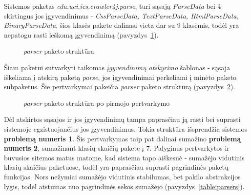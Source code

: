 Sistemos paketas \textit{edu.uci.ics.crawler4j.parse}, turi sąsają \textit{ParseData} bei 4 skirtingus jos įgyvendinimus - \textit{CssParseData, TextParseData, HtmlParseData, BinaryParseData},
šios klasės pakete dalinasi vieta dar su 9 klasėmis, todėl yra nepatogu rasti ieškomą įgyvendinimą (pavyzdys~\ref{fig:parse}).
\begin{figure}[H]
    \snugshade
    \endsnugshade
    \caption{\textit{parser} paketo struktūra}
    \label{fig:parse}
\end{figure}
Šiam paketui sutvarkyti taikomas \textit{įgyvendinimų atskyrimo} šablonas - sąsaja iškeliama į atskirą paketą \textit{parse}, jos įgyvendinimai perkeliami į minėto
paketo subpaketus.
Šie pertvarkymai pakeičia \textit{parser} paketo struktūrą (pavyzdys~\ref{fig:parser}).
\begin{figure}[H]
    \snugshade
    \endsnugshade
    \caption{\textit{parser} paketo struktūra po pirmojo pertvarkymo}
    \label{fig:parser}
\end{figure}
Dėl atskirtos sąsajos ir jos įgyvendinimų tampa paprasčiau ją rasti bei suprasti sistemoje egzistuojančius jos įgyvendinimus.
Tokia struktūra išsprendžia sistemos \textbf{problemą numeris 1}.
Šis pertvarkymas taip pat dalinai sumažino \textbf{problemą numeris 2}, sumažinant klasių skaičių pakete į 7.
Palyginus pertvarkytos ir buvusios sitemos matus matome, kad sistema tapo aiškesnė - sumažėjo vidutinis klasių skaičius paketuose,
todėl yra paprasčiau suprasti pagrindinės paketų funkcijas.
Nors nežymiai sumažėjo vidutinis stabilumas, bet pakilo abstrakcijos lygis, todėl atstumas nuo pagrindinės sekos sumažėjo (pavyzdys~\ref{table:parsers}).
